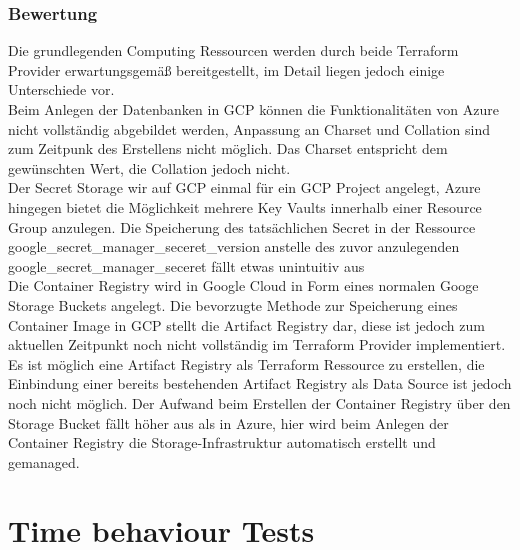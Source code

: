 \begin{spacing}{1.2}
\subsubsection{Bewertung}
Die grundlegenden Computing Ressourcen werden durch beide Terraform
Provider erwartungsgemäß bereitgestellt, im Detail liegen jedoch
einige Unterschiede vor.\\
Beim Anlegen der Datenbanken in GCP können die Funktionalitäten von
Azure nicht vollständig abgebildet werden, Anpassung an Charset und
Collation sind zum Zeitpunk des Erstellens nicht möglich.
Das Charset entspricht dem gewünschten Wert, die Collation jedoch
nicht.\\
Der Secret Storage wir auf GCP einmal für ein GCP Project angelegt,
Azure hingegen bietet die Möglichkeit mehrere Key Vaults innerhalb
einer Resource Group anzulegen. Die Speicherung des tatsächlichen Secret
in der Ressource google\_secret\_manager\_seceret\_version anstelle
des zuvor anzulegenden google\_secret\_manager\_seceret fällt
etwas unintuitiv aus\\
Die Container Registry wird in Google Cloud in Form eines normalen
Googe Storage Buckets angelegt. Die bevorzugte Methode zur Speicherung
eines Container Image in GCP stellt die Artifact Registry dar,
diese ist jedoch zum aktuellen Zeitpunkt noch nicht vollständig im
Terraform Provider implementiert. Es ist möglich eine Artifact
Registry als Terraform Ressource zu erstellen, die Einbindung einer
bereits bestehenden Artifact Registry als Data Source ist jedoch
noch nicht möglich. Der Aufwand beim Erstellen der Container Registry
über den Storage Bucket fällt höher aus als in Azure, hier wird beim
Anlegen der Container Registry die Storage-Infrastruktur automatisch
erstellt und gemanaged.

\section{Time behaviour Tests}


\end{spacing}
